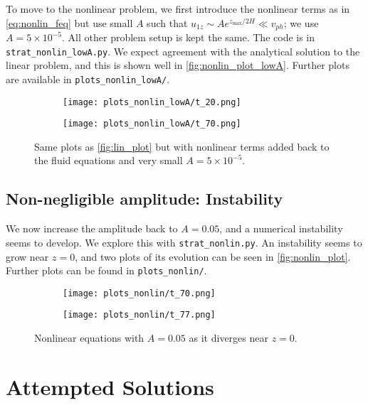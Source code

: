 \documentclass[11pt,
        usenames, %
        dvipsnames %
    ]{article}
\newcommand*{\scinot}[2]{#1\times10^{#2}}
\begin{document}
To move to the nonlinear problem, we first introduce the nonlinear terms as in
\autoref{eq:nonlin_feq} but use small $A$ such that $u_{1z} \sim
Ae^{z_{\max}/2H} \ll v_{ph}$; we use $A = \scinot{5}{-5}$. All other problem
setup is kept the same. The code is in \texttt{strat\_nonlin\_lowA.py}. We
expect agreement with the analytical solution to the linear problem, and this is
shown well in \autoref{fig:nonlin_plot_lowA}. Further plots are available in
\texttt{plots\_nonlin\_lowA/}.
\begin{figure}[t]
    \centering
    \begin{subfigure}{0.75\textwidth}
        \centering
        \texttt{[image: plots\_nonlin\_lowA/t\_20.png]}
    \end{subfigure}
    \begin{subfigure}{0.75\textwidth}
        \centering
        \texttt{[image: plots\_nonlin\_lowA/t\_70.png]}
    \end{subfigure}
    \caption{Same plots as \autoref{fig:lin_plot} but with nonlinear terms added
    back to the fluid equations and very small $A = \scinot{5}{-5}$.
    }\label{fig:nonlin_plot_lowA}
\end{figure}

\subsection{Non-negligible amplitude: Instability}

We now increase the amplitude back to $A = 0.05$, and a numerical instability
seems to develop. We explore this with \texttt{strat\_nonlin.py}. An instability
seems to grow near $z = 0$, and two plots of its evolution can be seen in
\autoref{fig:nonlin_plot}. Further plots can be found in
\texttt{plots\_nonlin/}.
\begin{figure}[t]
    \centering
    \begin{subfigure}{0.75\textwidth}
        \centering
        \texttt{[image: plots\_nonlin/t\_70.png]}
    \end{subfigure}
    \begin{subfigure}{0.75\textwidth}
        \centering
        \texttt{[image: plots\_nonlin/t\_77.png]}
    \end{subfigure}
    \caption{Nonlinear equations with $A = 0.05$ as it diverges near $z = 0$.
    }\label{fig:nonlin_plot}
\end{figure}

\section{Attempted Solutions}
\end{document}
